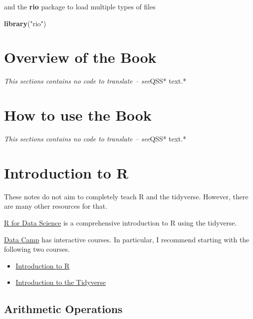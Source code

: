 \documentclass[]{book}
\newenvironment{Shaded}{\begin{snugshade}}{\end{snugshade}}
\newcommand{\KeywordTok}[1]{\textcolor[rgb]{0.13,0.29,0.53}{\textbf{#1}}}
\newcommand{\NormalTok}[1]{#1}
\newcommand{\StringTok}[1]{\textcolor[rgb]{0.31,0.60,0.02}{#1}}
\providecommand{\tightlist}{%
  \setlength{\itemsep}{0pt}\setlength{\parskip}{0pt}}
\theoremstyle{definition}
\theoremstyle{definition}
\theoremstyle{definition}
\theoremstyle{remark}
\begin{document}
and the \textbf{rio} package to load multiple types of files

\begin{Shaded}
\begin{Highlighting}[]
\KeywordTok{library}\NormalTok{(}\StringTok{"rio"}\NormalTok{)}
\end{Highlighting}
\end{Shaded}

\hypertarget{overview-of-the-book}{%
\section{Overview of the Book}\label{overview-of-the-book}}

\emph{This sections contains no code to translate -- see}QSS* text.*

\hypertarget{how-to-use-the-book}{%
\section{How to use the Book}\label{how-to-use-the-book}}

\emph{This sections contains no code to translate -- see}QSS* text.*

\hypertarget{introduction-to-r}{%
\section{Introduction to R}\label{introduction-to-r}}

These notes do not aim to completely teach R and the tidyverse. However,
there are many other resources for that.

\href{http://r4ds.had.co.nz/}{R for Data Science} is a comprehensive
introduction to R using the tidyverse.

\href{https://www.datacamp.com/home}{Data Camp} has interactive courses.
In particular, I recommend starting with the following two courses.

\begin{itemize}
\tightlist
\item
  \href{https://www.datacamp.com/courses/free-introduction-to-r}{Introduction
  to R}
\item
  \href{https://www.datacamp.com/courses/introduction-to-the-tidyverse}{Introduction
  to the Tidyverse}
\end{itemize}

\hypertarget{arithmetic-operations}{%
\subsection{Arithmetic Operations}\label{arithmetic-operations}}
\end{document}
